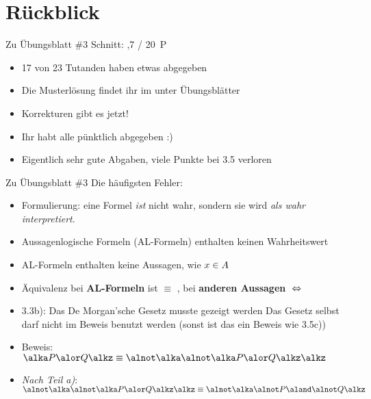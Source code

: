 
\newcommand{\handout}{}



\morescalingdelimiters




\section{Rückblick}

\begin{frame}{Zu Übungsblatt \#3}
	Schnitt: ,7 / 20~P

	\begin{itemize}[<+->]
		\item 17 von 23 Tutanden haben etwas abgegeben
		\item Die Musterlösung findet ihr im \ILIAS unter Übungsblätter
		\item Korrekturen gibt es jetzt!
		\item Ihr habt alle pünktlich abgegeben :)
		\item Eigentlich sehr gute Abgaben, viele Punkte bei 3.5 verloren
	\end{itemize}
\end{frame}

\begin{frame}{Zu Übungsblatt \#3}
	Die häufigsten Fehler:
	\begin{itemize}[<+->]
		\item Formulierung: eine Formel \textit{ist} nicht wahr, sondern sie wird \textit{als wahr interpretiert}.
		\item Aussagenlogische Formeln (AL-Formeln) enthalten keinen Wahrheitswert
		\item AL-Formeln enthalten keine Aussagen, wie $x \in A$
		\item Äquivalenz bei \textbf{AL-Formeln} ist $\equiv$ , bei \textbf{anderen Aussagen} $\gdw$
		\item 3.3b): Das De Morgan'sche Gesetz musste gezeigt werden
		\implitem Das Gesetz selbst darf nicht im Beweis benutzt werden (sonst ist das ein Beweis wie 3.5c))
		\item[] Beweis: $\bleftBr P \boder Q \brightBr \equiv \bnot\bleftBr\bnot \bleftBr P \boder Q \brightBr\brightBr$
		\item[] \textit{Nach Teil a)}:  $\bnot\bleftBr\bnot \bleftBr P \boder Q \brightBr \brightBr \equiv \bnot \bleftBr \bnot P \bund \bnot Q \brightBr$
	\end{itemize}
\end{frame}

